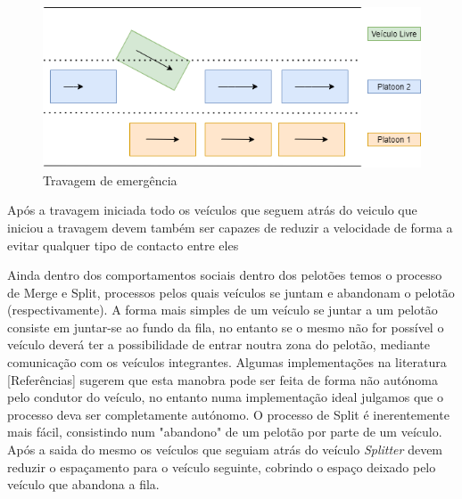 \begin{figure}[H]
    \centering
    \includegraphics[scale=0.4]{Images/brakeCheck.png}
    \caption{Travagem de emergência}
    \label{fig:my_label}
\end{figure}
\begin{center}
    Após a travagem iniciada todo os veículos que seguem atrás do veiculo que iniciou a travagem devem também ser capazes de reduzir a velocidade de forma a evitar qualquer tipo de contacto entre eles
\end{center}

Ainda dentro dos comportamentos sociais dentro dos pelotões temos o processo de Merge e Split, processos pelos quais veículos se juntam e abandonam o pelotão (respectivamente). A forma mais simples de um veículo se juntar a um pelotão consiste em juntar-se ao fundo da fila, no entanto se o mesmo não for possível o veículo deverá ter a possibilidade de entrar noutra zona do pelotão, mediante comunicação com os veículos integrantes. Algumas implementações na literatura [Referências] sugerem que esta manobra pode ser feita de forma não autónoma pelo condutor do veículo, no entanto numa implementação ideal julgamos que o processo deva ser completamente autónomo. O processo de Split é inerentemente mais fácil, consistindo num "abandono" de um pelotão por parte de um veículo. Após a saida do mesmo os veículos que seguiam atrás do veículo \textit{Splitter} devem reduzir o espaçamento para o veículo seguinte, cobrindo o espaço deixado pelo veículo que abandona a fila.

